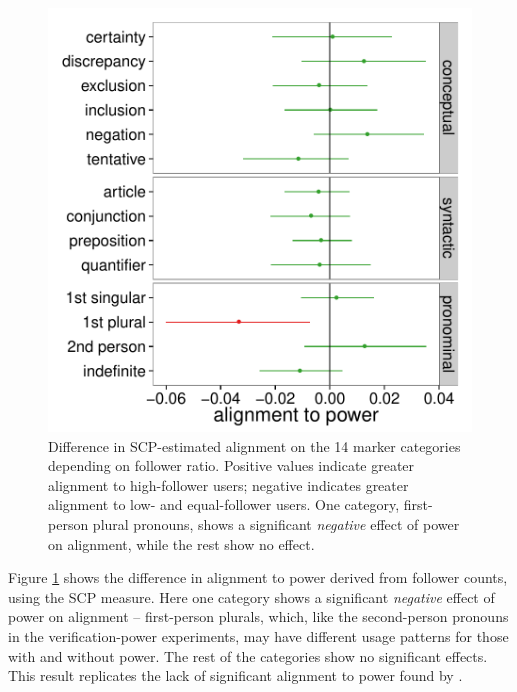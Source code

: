 \documentclass{acm_proc_article-sp}
\begin{document}


\begin{figure}[t]
\centering
\includegraphics[width=.9\columnwidth]{graphics/www2016_dnmpowerdiff_fratio_final.pdf}
\caption{Difference in SCP-estimated alignment on the 14 marker categories depending on follower ratio. Positive values indicate greater alignment to high-follower users; negative indicates greater alignment to low- and equal-follower users. One category, first-person plural pronouns, shows a significant \textit{negative} effect of power on alignment, while the rest show no effect.}\label{fig:dnm-fratio}
\end{figure}

Figure \ref{fig:dnm-fratio} shows the difference in alignment to power derived from follower counts, using the SCP measure. Here one category shows a significant \emph{negative} effect of power on alignment -- first-person plurals, which, like the second-person pronouns in the verification-power experiments, may have different usage patterns for those with and without power.  The rest of the categories show no significant effects.  This result replicates the lack of significant alignment to power found by \cite{DNMGamonDumais2011}.
\end{document}
